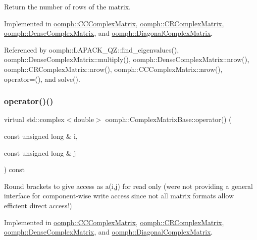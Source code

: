 Return the number of rows of the matrix. 



Implemented in \hyperlink{classoomph_1_1CCComplexMatrix_a52c78210ebe95b72ead8d938f5c7a9bb}{oomph\+::\+C\+C\+Complex\+Matrix}, \hyperlink{classoomph_1_1CRComplexMatrix_a08280a10665278ab233777ca7f510345}{oomph\+::\+C\+R\+Complex\+Matrix}, \hyperlink{classoomph_1_1DenseComplexMatrix_aea9edba37ef5fd679d17f22eaeb85369}{oomph\+::\+Dense\+Complex\+Matrix}, and \hyperlink{classoomph_1_1DiagonalComplexMatrix_a9a58381c1aa8d680373305a27bc88c25}{oomph\+::\+Diagonal\+Complex\+Matrix}.



Referenced by oomph\+::\+L\+A\+P\+A\+C\+K\+\_\+\+Q\+Z\+::find\+\_\+eigenvalues(), oomph\+::\+Dense\+Complex\+Matrix\+::multiply(), oomph\+::\+Dense\+Complex\+Matrix\+::nrow(), oomph\+::\+C\+R\+Complex\+Matrix\+::nrow(), oomph\+::\+C\+C\+Complex\+Matrix\+::nrow(), operator=(), and solve().

\mbox{\label{classoomph_1_1ComplexMatrixBase_a78d1185ec8249fec5855d01129a1c870}} 
\subsubsection{\texorpdfstring{operator()()}{operator()()}}
{\footnotesize\ttfamily virtual std\+::complex$<$double$>$ oomph\+::\+Complex\+Matrix\+Base\+::operator() (\begin{DoxyParamCaption}\item[{const unsigned long \&}]{i,  }\item[{const unsigned long \&}]{j }\end{DoxyParamCaption}) const\hspace{0.3cm}{\ttfamily [pure virtual]}}



Round brackets to give access as a(i,j) for read only (we\textquotesingle{}re not providing a general interface for component-\/wise write access since not all matrix formats allow efficient direct access!) 



Implemented in \hyperlink{classoomph_1_1CCComplexMatrix_a09035e7b3fc0346ed91f4ddff4bebc13}{oomph\+::\+C\+C\+Complex\+Matrix}, \hyperlink{classoomph_1_1CRComplexMatrix_a1a800a78ffb803e931d6884c66e9220d}{oomph\+::\+C\+R\+Complex\+Matrix}, \hyperlink{classoomph_1_1DenseComplexMatrix_ad59f7b0bbbbce05868a80fcfd3f08560}{oomph\+::\+Dense\+Complex\+Matrix}, and \hyperlink{classoomph_1_1DiagonalComplexMatrix_aa8f257263497d498f52881a19281ce63}{oomph\+::\+Diagonal\+Complex\+Matrix}.



